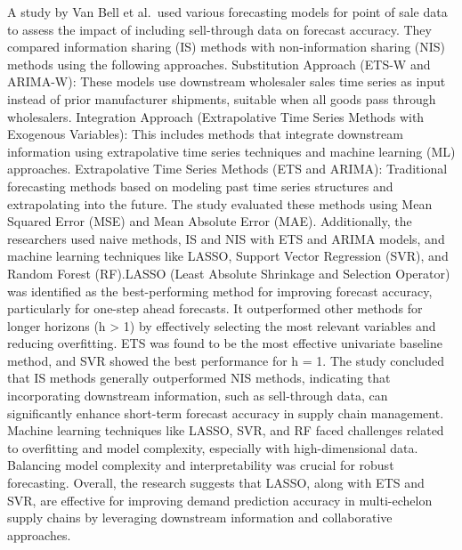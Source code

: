\documentclass[
  authoryear,
  preprint,
  3p]{elsarticle}
\begin{document}
A study by Van Bell et al.~used various forecasting models for point of
sale data to assess the impact of including sell-through data on
forecast accuracy. They compared information sharing (IS) methods with
non-information sharing (NIS) methods using the following approaches.
Substitution Approach (ETS-W and ARIMA-W): These models use downstream
wholesaler sales time series as input instead of prior manufacturer
shipments, suitable when all goods pass through wholesalers. Integration
Approach (Extrapolative Time Series Methods with Exogenous Variables):
This includes methods that integrate downstream information using
extrapolative time series techniques and machine learning (ML)
approaches. Extrapolative Time Series Methods (ETS and ARIMA):
Traditional forecasting methods based on modeling past time series
structures and extrapolating into the future. The study evaluated these
methods using Mean Squared Error (MSE) and Mean Absolute Error (MAE).
Additionally, the researchers used naive methods, IS and NIS with ETS
and ARIMA models, and machine learning techniques like LASSO, Support
Vector Regression (SVR), and Random Forest (RF).LASSO (Least Absolute
Shrinkage and Selection Operator) was identified as the best-performing
method for improving forecast accuracy, particularly for one-step ahead
forecasts. It outperformed other methods for longer horizons (h
\textgreater{} 1) by effectively selecting the most relevant variables
and reducing overfitting. ETS was found to be the most effective
univariate baseline method, and SVR showed the best performance for h =
1. The study concluded that IS methods generally outperformed NIS
methods, indicating that incorporating downstream information, such as
sell-through data, can significantly enhance short-term forecast
accuracy in supply chain management. Machine learning techniques like
LASSO, SVR, and RF faced challenges related to overfitting and model
complexity, especially with high-dimensional data. Balancing model
complexity and interpretability was crucial for robust forecasting.
Overall, the research suggests that LASSO, along with ETS and SVR, are
effective for improving demand prediction accuracy in multi-echelon
supply chains by leveraging downstream information and collaborative
approaches\citep{van2021using}.
\end{document}
